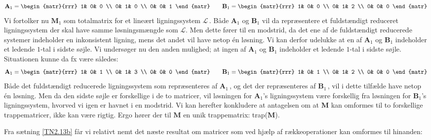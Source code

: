\begin{bevis}
\begin{equation}
\mathbf{A}_1=
\begin{matr}{rrr}
 1& 0& 0 \\
 0&  1& 0 \\
 0& 0&  1
\end{matr} \quad \quad
\mathbf{B}_1=
\begin{matr}{rrr}
 1& 0& 0 \\
 0& 1& 2 \\
 0& 0& 0
\end{matr}
\end{equation}
Vi fortolker nu $\mathbf{M}_1$ som totalmatrix for et lineært ligningssystem $\mathcal L\,$. Både $\mathbf{A}_1$ og $\mathbf{B}_1$ vil da repræsentere et fuldstændigt reduceret ligningssystem der skal have samme løs\-nings\-mæng\-de som $\mathcal L$. Men dette fører til en modstrid, da det ene af de fuldstændigt reducerede systemer indeholder en inkonsistent ligning, mens det andet vil have netop én løsning. Vi kan derfor udelukke at en af $\mathbf{A}_1$ og $\mathbf{B}_1$ indeholder et ledende $1$-tal i sidste søjle.\bs
Vi undersøger nu den anden mulighed; at ingen af $\mathbf{A}_1$ og $\mathbf{B}_1$ indeholder et ledende $1$-tal i sidste søjle. Situationen kunne da fx være således:
\begin{equation}
\mathbf{A}_1=
\begin{matr}{rrr}
 1& 0& 1 \\
 0&  1& 3 \\
 0& 0& 0
\end{matr} \quad \quad
\mathbf{B}_1=
\begin{matr}{rrr}
 1& 0& 1 \\
 0& 1& 2 \\
 0& 0&  0
\end{matr}
\end{equation}
Både det fuldstændigt reducerede ligningssystem som repræsenteres af $\mathbf{A}_1\,$, og det der repræsenteres af $\mathbf{B}_1\,$, vil i dette tilfælde have netop én løsning. Men da den sidste søjle er forskellige i de to matricer, vil løsningen for $\mathbf{A}_1$'s ligningssystem være forskellig fra løsningen for $\mathbf{B}_1$'s ligningssystem, hvorved vi igen er havnet i en modstrid.\bs
Vi kan herefter konkludere at antagelsen om at $\mathbf{M}$ kan omformes til to forskellige trappematricer, ikke kan være rigtig. Ergo hører der til $\mathbf{M}$ en unik trappematrix: trap($\mathbf{M}$). 
\end{bevis}

Fra sætning \ref{TN2.13b} får vi relativt nemt det næste resultat om matricer som ved hjælp af rækkeoperationer kan omformes til hinanden:

